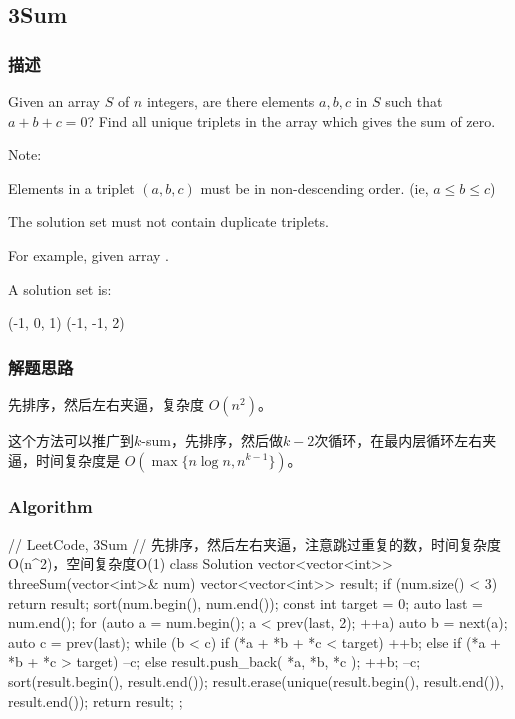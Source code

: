 \subsection{3Sum} %
\label{sec:3sum}


\subsubsection{描述}
Given an array $S$ of $n$ integers, are there elements $a, b, c$ in $S$ such 
that $a + b + c = 0$? Find all unique triplets in the array which gives the sum 
of zero.

Note:
\begindot
\item Elements in a triplet $(a,b,c)$ must be in non-descending order. (ie, $a 
\leq b \leq c$)
\item The solution set must not contain duplicate triplets.
\myenddot

For example, given array .

A solution set is:
\begin{Code}
	(-1, 0, 1)
	(-1, -1, 2)
\end{Code}


\subsubsection{解题思路}
先排序，然后左右夹逼，复杂度 $O(n^2)$。

这个方法可以推广到$k$-sum，先排序，然后做$k-2$次循环，在最内层循环左右夹逼，时间复杂度是 
$O(\max\{n \log n, n^{k-1}\})$。


\subsubsection{Algorithm}
\begin{Code}
	// LeetCode, 3Sum
	// 先排序，然后左右夹逼，注意跳过重复的数，时间复杂度O(n^2)，空间复杂度O(1)
	class Solution {
		vector<vector<int>> threeSum(vector<int>& num) {
			vector<vector<int>> result;
			if (num.size() < 3) return result;
			sort(num.begin(), num.end());
			const int target = 0;
			auto last = num.end();
			for (auto a = num.begin(); a < prev(last, 2); ++a) {
				auto b = next(a);
				auto c = prev(last);
				while (b < c) {
					if (*a + *b + *c < target) {
						++b;
					} else if (*a + *b + *c > target) {
						--c;
					} else {
						result.push_back({ *a, *b, *c });
						++b;
						--c;
					}
				}
			}
			sort(result.begin(), result.end());
			result.erase(unique(result.begin(), result.end()), result.end());
			return result;
		}
	};
\end{Code}

